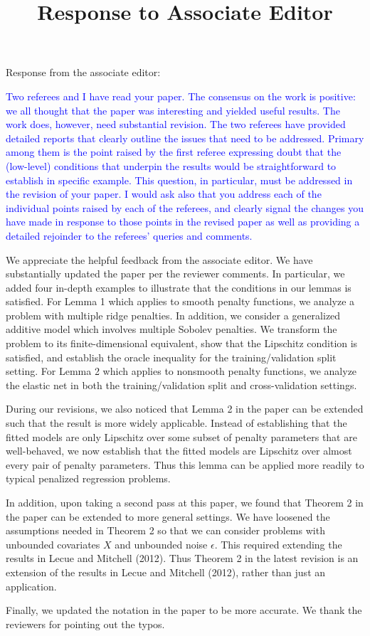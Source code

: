 \documentclass[]{article}
\title{Response to Associate Editor}
\newcommand{\overall}[1]{\textcolor{blue}{#1}}
\begin{document}
	
	\maketitle
	
	
	Response from the associate editor:
	
	\overall{
		Two referees and I have read your paper. The consensus on the work is positive: we all thought that the paper was interesting and yielded useful results. The work does, however, need substantial revision. The two referees have provided detailed reports that clearly outline the issues that need to be addressed. Primary among them is the point raised by the first referee expressing doubt that the (low-level) conditions that underpin the results would be straightforward to establish in specific example. This question, in particular, must be addressed in the revision of your paper. I would ask also that you address each of the individual points raised by each of the referees, and clearly signal the changes you have made in response to those points in the revised paper as well as providing a detailed rejoinder to the referees' queries and comments.
	}

	We appreciate the helpful feedback from the associate editor.
	We have substantially updated the paper per the reviewer comments.
	In particular, we added four in-depth examples to illustrate that the conditions in our lemmas is satisfied.
	For Lemma 1 which applies to smooth penalty functions, we analyze a problem with multiple ridge penalties.
	In addition, we consider a generalized additive model which involves multiple Sobolev penalties.
	We transform the problem to its finite-dimensional equivalent, show that the Lipschitz condition is satisfied, and establish the oracle inequality for the training/validation split setting.
	For Lemma 2 which applies to nonsmooth penalty functions, we analyze the elastic net in both the training/validation split and cross-validation settings.
	
	During our revisions, we also noticed that Lemma 2 in the paper can be extended such that the result is more widely applicable.
	Instead of establishing that the fitted models are only Lipschitz over some subset of penalty parameters that are well-behaved, we now establish that the fitted models are Lipschitz over almost every pair of penalty parameters.
	Thus this lemma can be applied more readily to typical penalized regression problems.

	In addition, upon taking a second pass at this paper, we found that Theorem 2 in the paper can be extended to more general settings.
	We have loosened the assumptions needed in Theorem 2 so that we can consider problems with unbounded covariates $X$ and unbounded noise $\epsilon$.
	This required extending the results in Lecue and Mitchell (2012).
	Thus Theorem 2 in the latest revision is an extension of the results in Lecue and Mitchell (2012), rather than just an application.
	
	Finally, we updated the notation in the paper to be more accurate. We thank the reviewers for pointing out the typos.
\end{document}
